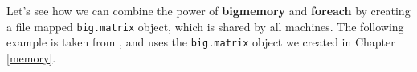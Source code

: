 \documentclass[]{book}
\newenvironment{Shaded}{\begin{snugshade}}{\end{snugshade}}
\newcommand{\DataTypeTok}[1]{\textcolor[rgb]{0.13,0.29,0.53}{#1}}
\newcommand{\DecValTok}[1]{\textcolor[rgb]{0.00,0.00,0.81}{#1}}
\newcommand{\KeywordTok}[1]{\textcolor[rgb]{0.13,0.29,0.53}{\textbf{#1}}}
\newcommand{\NormalTok}[1]{#1}
\newcommand{\OperatorTok}[1]{\textcolor[rgb]{0.81,0.36,0.00}{\textbf{#1}}}
\newcommand{\OtherTok}[1]{\textcolor[rgb]{0.56,0.35,0.01}{#1}}
\newcommand{\StringTok}[1]{\textcolor[rgb]{0.31,0.60,0.02}{#1}}
\theoremstyle{definition}
\theoremstyle{definition}
\theoremstyle{definition}
\theoremstyle{remark}
\begin{document}
\begin{Shaded}
\end{Shaded}

Let's see how we can combine the power of \textbf{bigmemory} and \textbf{foreach} by creating a file mapped \texttt{big.matrix} object, which is shared by all machines.
The following example is taken from \citet{kane2013scalable}, and uses the \texttt{big.matrix} object we created in Chapter \ref{memory}.
\end{document}
